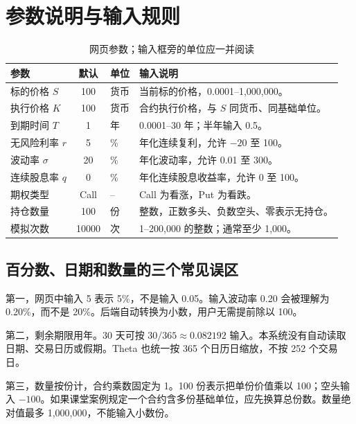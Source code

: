 \documentclass[UTF8,a4paper,12pt]{ctexart}
\begin{document}
\section{参数说明与输入规则}
\begin{table}[H]\centering\small
\begin{tabularx}{\linewidth}{lclX}\toprule 参数 & 默认 & 单位 & 输入说明\\\midrule
标的价格 $S$ & 100 & 货币 & 当前标的价格，0.0001--1,000,000。\\
执行价格 $K$ & 100 & 货币 & 合约执行价格，与 $S$ 同货币、同基础单位。\\
到期时间 $T$ & 1 & 年 & 0.0001--30 年；半年输入 0.5。\\
无风险利率 $r$ & 5 & \% & 年化连续复利，允许 $-20$ 至 100。\\
波动率 $\sigma$ & 20 & \% & 年化波动率，允许 0.01 至 300。\\
连续股息率 $q$ & 0 & \% & 年化连续股息收益率，允许 0 至 100。\\
期权类型 & Call & -- & Call 为看涨，Put 为看跌。\\
持仓数量 & 100 & 份 & 整数，正数多头、负数空头、零表示无持仓。\\
模拟次数 & 10000 & 次 & 1--200,000 的整数；通常至少 1,000。\\\bottomrule
\end{tabularx}\caption{网页参数；输入框旁的单位应一并阅读}
\end{table}

\subsection*{百分数、日期和数量的三个常见误区}
第一，网页中输入 5 表示 5\%，不是输入 0.05。输入波动率 0.20 会被理解为 0.20\%，而不是 20\%。后端自动转换为小数，用户无需提前除以 100。

第二，剩余期限用年。30 天可按 $30/365\approx0.082192$ 输入。本系统没有自动读取日期、交易日历或假期。Theta 也统一按 365 个日历日缩放，不按 252 个交易日。

第三，数量按份计，合约乘数固定为 1。100 份表示把单份价值乘以 100；空头输入 $-100$。如果课堂案例规定一个合约含多份基础单位，应先换算总份数。数量绝对值最多 1,000,000，不能输入小数份。
\end{document}
